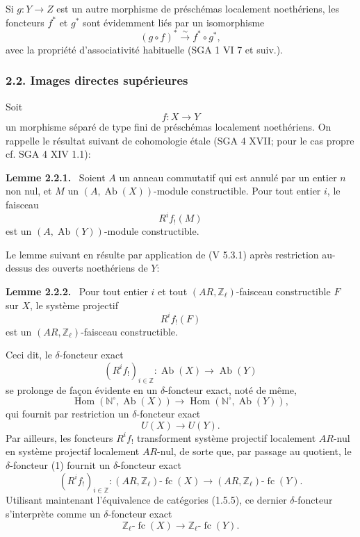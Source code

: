 \documentclass[11pt]{article}
\newenvironment{statement}[1]{\par\medskip\noindent\textbf{#1.}\ }{\par\medskip}
\DeclareMathOperator{\Hom}{Hom}
\providecommand{\Hom}{\operatorname{Hom}}
\providecommand{\Ab}{\operatorname{Ab}}
\providecommand{\fc}{\operatorname{fc}}
\providecommand{\Ab}{\operatorname{Ab}}
\begin{document}
Si \(g:Y\to Z\) est un autre morphisme de préschémas localement noethériens, les foncteurs \(f^*\) et \(g^*\) sont évidemment liés par un isomorphisme
\[
(g\circ f)^*\xrightarrow{\sim}f^*\circ g^*,
\]
avec la propriété d'associativité habituelle (SGA 1 VI 7 et suiv.).

\subsubsection*{2.2. Images directes supérieures}

Soit
\[
f:X\longrightarrow Y
\]
un morphisme séparé de type fini de préschémas localement noethériens. On rappelle le résultat suivant de cohomologie étale (SGA 4 XVII; pour le cas propre cf. SGA 4 XIV 1.1):

\begin{statement}{Lemme 2.2.1}
Soient \(A\) un anneau commutatif qui est annulé par un entier \(n\) non nul, et \(M\) un \((A,\Ab(X))\)-module constructible. Pour tout entier \(i\), le faisceau
\[
R^if_!(M)
\]
est un \((A,\Ab(Y))\)-module constructible.
\end{statement}

Le lemme suivant en résulte par application de (V 5.3.1) après restriction au-dessus des ouverts noethériens de \(Y\):

\begin{statement}{Lemme 2.2.2}
Pour tout entier \(i\) et tout \((AR,\mathbb Z_\ell)\)-faisceau constructible \(F\) sur \(X\), le système projectif
\[
R^if_!(F)
\]
est un \((AR,\mathbb Z_\ell)\)-faisceau constructible.
\end{statement}

Ceci dit, le \(\delta\)-foncteur exact
\[
(R^if_!)_{i\in\mathbb Z}:\Ab(X)\longrightarrow \Ab(Y)
\]
se prolonge de façon évidente en un \(\delta\)-foncteur exact, noté de même,
\[
\Hom(\mathbb N^\circ,\Ab(X))\longrightarrow \Hom(\mathbb N^\circ,\Ab(Y)),
\]
qui fournit par restriction un \(\delta\)-foncteur exact
\[
U(X)\longrightarrow U(Y).
\tag{1}
\]
Par ailleurs, les foncteurs \(R^if_!\) transforment système projectif localement \(AR\)-nul en système projectif localement \(AR\)-nul, de sorte que, par passage au quotient, le \(\delta\)-foncteur (1) fournit un \(\delta\)-foncteur exact
\[
(R^if_!)_{i\in\mathbb Z}:(AR,\mathbb Z_\ell)\text{-}\fc(X)
\longrightarrow (AR,\mathbb Z_\ell)\text{-}\fc(Y).
\]
Utilisant maintenant l'équivalence de catégories (1.5.5), ce dernier \(\delta\)-foncteur s'interprète comme un \(\delta\)-foncteur exact
\[
\mathbb Z_\ell\text{-}\fc(X)\longrightarrow \mathbb Z_\ell\text{-}\fc(Y).
\]
\end{document}
